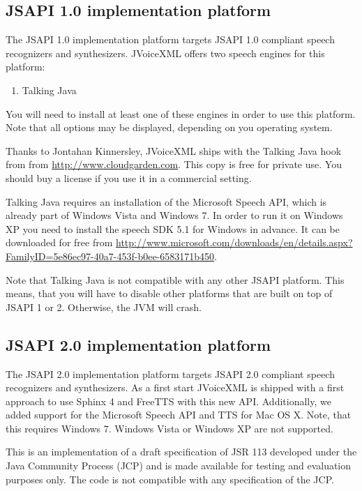 \documentclass[11pt,a4paper]{book}
\begin{document}
\subsection{JSAPI 1.0 implementation platform}

The JSAPI 1.0 implementation platform targets JSAPI 1.0 compliant speech
recognizers and synthesizers. JVoiceXML offers two speech engines for this
platform:
\begin{enumerate}
  \item Talking Java
\end{enumerate}

You will need to install at least one of these engines in order to use this
platform. Note that all options may be displayed, depending on you operating
system.

Thanks to Jontahan Kinnersley, JVoiceXML ships with the Talking Java hook from
from \url{http://www.cloudgarden.com}. This copy is free for
private use. You should buy a license if you use it in a commercial setting.

Talking Java requires an installation of the Microsoft Speech API, which is
already part of Windows Vista and Windows 7. In order to run it on Windows XP
you need to install the speech SDK 5.1 for Windows in advance. It can be
downloaded for free from
\url{http://www.microsoft.com/downloads/en/details.aspx?FamilyID=5e86ec97-40a7-453f-b0ee-6583171b450}.

Note that Talking Java is not compatible with any other JSAPI platform. This
means, that you will have to disable other platforms that are built on top of
JSAPI 1 or 2. Otherwise, the JVM will crash.

\subsection{JSAPI 2.0 implementation platform}

The JSAPI 2.0 implementation platform targets JSAPI 2.0 compliant speech
recognizers and synthesizers. As a first start JVoiceXML is shipped with a
first approach to use Sphinx 4 and FreeTTS with this new API. Additionally,
we added support for the Microsoft Speech API and TTS for Mac OS X.
Note, that this requires Windows 7. Windows Vista or Windows XP are not
supported. 

This is an implementation of a draft specification of JSR 113 developed under
the Java Community Process (JCP) and is made available for testing and evaluation
purposes only. The code is not compatible with any specification of the JCP.
\end{document}
